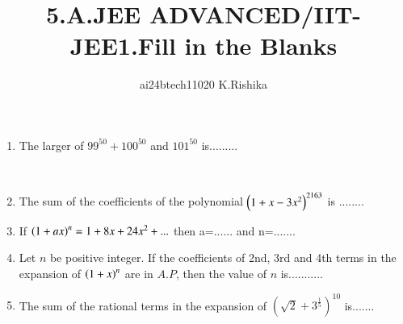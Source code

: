 \documentclass[journal,12pt,twocolumn]{IEEEtran}
\theoremstyle{remark}
\begin{document}

\vspace{3cm}

\title{5.A.JEE ADVANCED/IIT-JEE1.Fill in the Blanks}
\author{ai24btech11020 K.Rishika}

\maketitle
\bigskip   
\renewcommand{\thefigure}{\theenumi}
\renewcommand{\thetable}{\theenumi}     
\begin{enumerate}[start=1]
\item The larger of $99^{50}+100^{50}$ and $101^{50}$ is.........

	\hfill {}\\
\item The sum of the coefficients of the polynomial $\left(1+x-3x^2\right)^{2163}$ is ........
	\hfill {}\\
\item If $\left(1+ax\right)^n=1+8x+24x^2+...$ then a=...... and n=.......
	\hfill {}\\
\item Let $n$ be positive integer. If the coefficients of 2nd, 3rd and 4th terms in the expansion of $\left(1 + x\right)^n$ are in $A.P$, then the value of $n$ is...........
	\hfill {}\\
\item The sum of the rational terms in the expansion of $(\sqrt{2}+3^\frac{1}{5})^{10}$ is.......
	\hfill {}
\end{enumerate}
\end{document}
